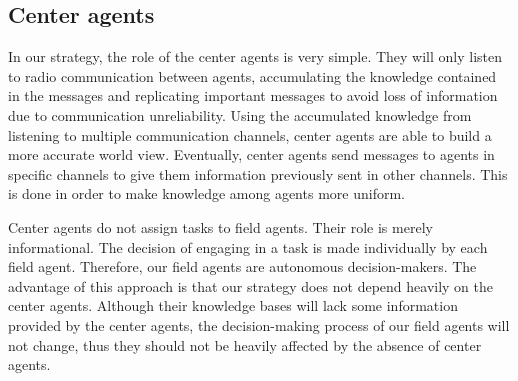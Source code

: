 \subsection{Center agents}

In our strategy, the role of the center agents is very simple. They will only listen to radio communication between agents, accumulating the knowledge contained in the messages and replicating important messages to avoid loss of information due to communication unreliability. Using the accumulated knowledge from listening to multiple communication channels, center agents are able to build a more accurate world view. Eventually, center agents send messages to agents in specific channels to give them information previously sent in other channels. This is done in order to make knowledge among agents more uniform.

Center agents do not assign tasks to field agents. Their role is merely informational. The decision of engaging in a task is made individually by each field agent. Therefore, our field agents are autonomous decision-makers. The advantage of this approach is that our strategy does not depend heavily on the center agents. Although their knowledge bases will lack some information provided by the center agents, the decision-making process of our field agents will not change, thus they should not be heavily affected by the absence of center agents.


